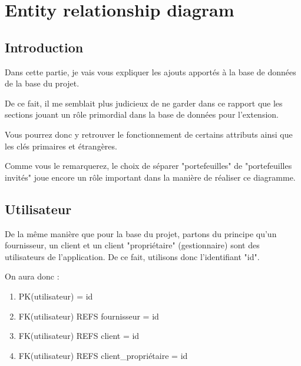 \section{Entity relationship diagram}
\subsection{Introduction}
\begin{flushleft}
Dans cette partie, je vais vous expliquer les ajouts apportés à la base de données de la base du projet. 
\end{flushleft}
\begin{flushleft}
De ce fait, il me semblait plus judicieux de ne garder dans ce rapport que les sections jouant un rôle primordial dans la base de données pour l'extension.
\end{flushleft}
\begin{flushleft}
Vous pourrez donc y retrouver le fonctionnement de certains attributs ainsi que les clés primaires et étrangères.
\end{flushleft}
\begin{flushleft}
Comme vous le remarquerez, le choix de séparer "portefeuilles" de "portefeuilles invités" joue encore un rôle important dans la manière de réaliser ce diagramme.
\end{flushleft}

\subsection{Utilisateur}
\begin{flushleft}
De la même manière que pour la base du projet, partons du principe qu'un fournisseur, un client et un client "propriétaire" (gestionnaire) sont des utilisateurs de l'application.\newline
De ce fait, utilisons donc l'identifiant "id".
\end{flushleft}

\begin{flushleft}
On aura donc :
\end{flushleft}

\begin{enumerate}
\item PK(utilisateur) = id
\item FK(utilisateur) REFS fournisseur = id
\item FK(utilisateur) REFS client = id
\item FK(utilisateur) REFS client\_propriétaire = id
\end{enumerate}

